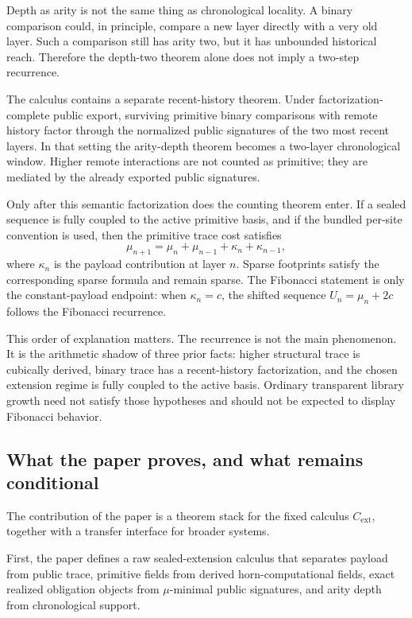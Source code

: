 \documentclass{lmcs}
\begin{document}
Depth as arity is not the same thing as chronological locality.  A binary
comparison could, in principle, compare a new layer directly with a very old
layer.  Such a comparison still has arity two, but it has unbounded historical
reach.  Therefore the depth-two theorem alone does not imply a two-step
recurrence.

The calculus contains a separate recent-history theorem.  Under
factorization-complete public export, surviving primitive binary comparisons with
remote history factor through the normalized public signatures of the two most
recent layers.  In that setting the arity-depth theorem becomes a two-layer
chronological window.  Higher remote interactions are not counted as primitive;
they are mediated by the already exported public signatures.

Only after this semantic factorization does the counting theorem enter.  If a
sealed sequence is fully coupled to the active primitive basis, and if the
bundled per-site convention is used, then the primitive trace cost satisfies
\[
  \mu_{n+1} = \mu_n + \mu_{n-1} + \kappa_n + \kappa_{n-1},
\]
where \(\kappa_n\) is the payload contribution at layer \(n\).  Sparse footprints
satisfy the corresponding sparse formula and remain sparse.  The Fibonacci
statement is only the constant-payload endpoint: when \(\kappa_n=c\), the shifted
sequence \(U_n=\mu_n+2c\) follows the Fibonacci recurrence.

This order of explanation matters.  The recurrence is not the main phenomenon.
It is the arithmetic shadow of three prior facts: higher structural trace is
cubically derived, binary trace has a recent-history factorization, and the
chosen extension regime is fully coupled to the active basis.  Ordinary
transparent library growth need not satisfy those hypotheses and should not be
expected to display Fibonacci behavior.

\subsection{What the paper proves, and what remains conditional}

The contribution of the paper is a theorem stack for the fixed calculus
\(C_{\mathrm{ext}}\), together with a transfer interface for broader systems.

First, the paper defines a raw sealed-extension calculus that separates payload
from public trace, primitive fields from derived horn-computational fields, exact
realized obligation objects from \(\mu\)-minimal public signatures, and arity
depth from chronological support.
\end{document}
